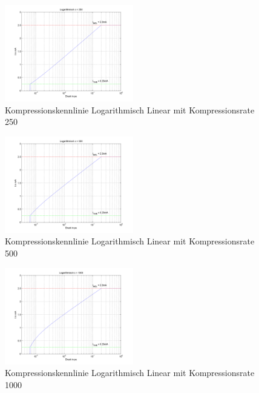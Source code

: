 \documentclass[conference]{IEEEtran}
\begin{document}
\begin{compactenum}[a)]
\begin{figure}
	\centering
	\includegraphics[width=0.5\textwidth]{img/log_250.png}
	\vspace{-10pt}
	\caption{Kompressionskennlinie Logarithmisch Linear mit Kompressionsrate 250}
	\vspace{-10pt}
	\label{fig:log_250}
\end{figure}
\begin{figure}[h]
	\centering
	\includegraphics[width=0.5\textwidth]{img/log_500.png}
	\vspace{-10pt}
	\caption{Kompressionskennlinie Logarithmisch Linear mit Kompressionsrate 500}
	\vspace{-10pt}
	\label{fig:log_500}
\end{figure}
\begin{figure}[h!]
	\centering
	\includegraphics[width=0.5\textwidth]{img/log_1000.png}
	\vspace{-10pt}
	\caption{Kompressionskennlinie Logarithmisch Linear mit Kompressionsrate 1000}
	\vspace{-10pt}
	\label{fig:log_1000}
\end{figure}
\end{compactenum}
\end{document}
